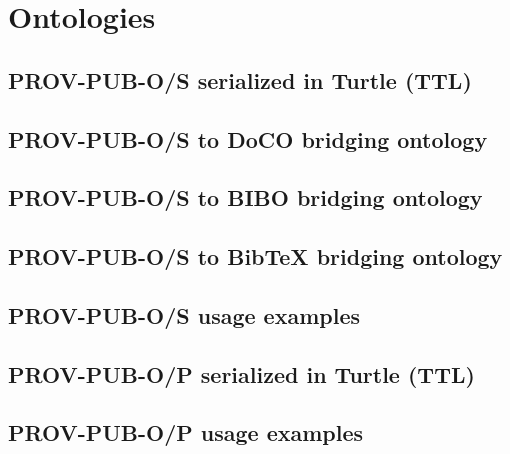  
\appendix    %

\chapter{Ontologies}
\section{PROV-PUB-O/S serialized in Turtle (TTL)}

\section{PROV-PUB-O/S to DoCO bridging ontology}

\section{PROV-PUB-O/S to BIBO bridging ontology}

\section{PROV-PUB-O/S to BibTeX bridging ontology}

\section{PROV-PUB-O/S usage examples}

\section{PROV-PUB-O/P serialized in Turtle (TTL)}

\section{PROV-PUB-O/P usage examples}


